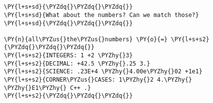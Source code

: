 

\section*{}

\begin{Verbatim}[commandchars=\\\{\}]
\PY{l+s+sd}{\PYZdq{}\PYZdq{}\PYZdq{}}
\PY{l+s+sd}{What about the numbers? Can we match those?}
\PY{l+s+sd}{\PYZdq{}\PYZdq{}\PYZdq{}}

\PY{n}{all\PYZus{}the\PYZus{}numbers} \PY{o}{=} \PY{l+s+s2}{\PYZdq{}\PYZdq{}\PYZdq{}}
\PY{l+s+s2}{INTEGERS: 1 +2 \PYZhy{}3}
\PY{l+s+s2}{DECIMAL: +42.5 \PYZhy{}.25 3.}
\PY{l+s+s2}{SCIENCE: .23E+4 \PYZhy{}4.00e\PYZhy{}02 +1e1}
\PY{l+s+s2}{CORNER\PYZus{}CASES: 1\PYZhy{}2 4.\PYZhy{} \PYZhy{}E1\PYZhy{} C++ .}
\PY{l+s+s2}{\PYZdq{}\PYZdq{}\PYZdq{}}
\end{Verbatim}

